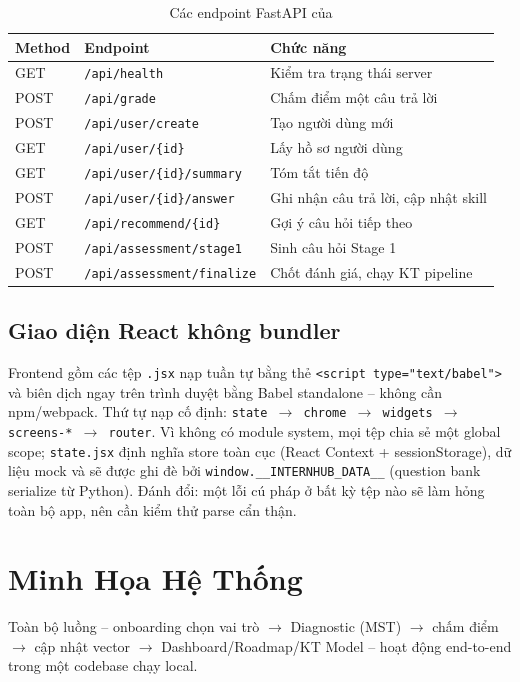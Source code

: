 \begin{table}[H]
  \centering
  \caption{Các endpoint FastAPI của \system{}}
  \label{tab:endpoints}
  \begin{tabular}{lll}
    \toprule
    \textbf{Method} & \textbf{Endpoint} & \textbf{Chức năng} \\
    \midrule
    GET  & \texttt{/api/health}                 & Kiểm tra trạng thái server \\
    POST & \texttt{/api/grade}                  & Chấm điểm một câu trả lời \\
    POST & \texttt{/api/user/create}            & Tạo người dùng mới \\
    GET  & \texttt{/api/user/\{id\}}            & Lấy hồ sơ người dùng \\
    GET  & \texttt{/api/user/\{id\}/summary}    & Tóm tắt tiến độ \\
    POST & \texttt{/api/user/\{id\}/answer}     & Ghi nhận câu trả lời, cập nhật skill \\
    GET  & \texttt{/api/recommend/\{id\}}       & Gợi ý câu hỏi tiếp theo \\
    POST & \texttt{/api/assessment/stage1}      & Sinh câu hỏi Stage 1 \\
    POST & \texttt{/api/assessment/finalize}    & Chốt đánh giá, chạy KT pipeline \\
    \bottomrule
  \end{tabular}
\end{table}

\subsection{Giao diện React không bundler}
Frontend gồm các tệp \texttt{.jsx} nạp tuần tự bằng thẻ \texttt{<script type="text/babel">} và biên dịch ngay trên trình duyệt bằng Babel standalone -- không cần npm/webpack. Thứ tự nạp cố định: \texttt{state $\to$ chrome $\to$ widgets $\to$ screens-* $\to$ router}. Vì không có module system, mọi tệp chia sẻ một global scope; \texttt{state.jsx} định nghĩa store toàn cục (React Context + sessionStorage), dữ liệu mock và sẽ được ghi đè bởi \texttt{window.\_\_INTERNHUB\_DATA\_\_} (question bank serialize từ Python). Đánh đổi: một lỗi cú pháp ở bất kỳ tệp nào sẽ làm hỏng toàn bộ app, nên cần kiểm thử parse cẩn thận.

\section{Minh Họa Hệ Thống}
\label{sec:demo}



Toàn bộ luồng -- onboarding chọn vai trò $\to$ Diagnostic (MST) $\to$ chấm điểm $\to$ cập nhật vector $\to$ Dashboard/Roadmap/KT Model -- hoạt động end-to-end trong một codebase chạy local.
